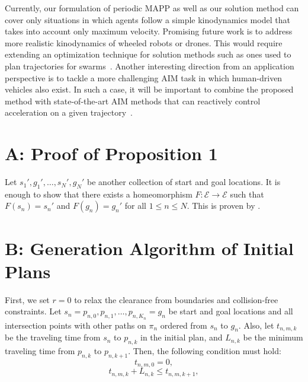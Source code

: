 \documentclass[letterpaper]{article} %
\begin{document}
Currently, our formulation of periodic MAPP as well as our solution method can cover only situations in which agents follow a simple kinodynamics model that takes into account only maximum velocity. Promising future work is to address more realistic kinodynamics of wheeled robots or drones. This would require extending an optimization technique for solution methods such as ones used to plan trajectories for swarms~\cite{honig2018trajectory}. Another interesting direction from an application perspective is to tackle a more challenging AIM task in which human-driven vehicles also exist. In such a case, it will be important to combine the proposed method with state-of-the-art AIM methods that can reactively control acceleration on a given trajectory~\cite{Kreidieh2018,Jang2019,Cui2021}.





\section{A: Proof of Proposition 1}
Let $s_1', g_1',\ldots, s_N', g_N'$ be another collection of start and goal locations. %
It is enough to show that there exists a homeomorphism $F:\mathcal{E} \rightarrow \mathcal{E}$ such that $F(s_n)=s_n'$ and $F(g_n)=g_n'$ for all $1\leq n \leq N$. This is proven by \citet{michor1994n}.

\section{B: Generation Algorithm of Initial Plans}
First, we set $r=0$ to relax the clearance from boundaries and collision-free constraints.
Let $s_n=p_{n, 0}, p_{n, 1}, \ldots, p_{n, K_n}=g_n$ be start and goal locations and all intersection points with other paths on $\pi_n$ ordered from $s_n$ to $g_n$. Also, let $t_{n,m,k}$ be the traveling time from $s_n$ to $p_{n,k}$ in the initial plan, and $L_{n,k}$ be the minimum traveling time from $p_{n,k}$ to $p_{n,k+1}$.
Then, the following condition must hold:
\begin{equation}\label{eq:zero condition}
    t_{n,m,0}=0,
\end{equation}
\begin{equation}\label{eq:L condition}
    t_{n,m,k}+L_{n,k}\leq t_{n,m,k+1},
\end{equation}
\end{document}
